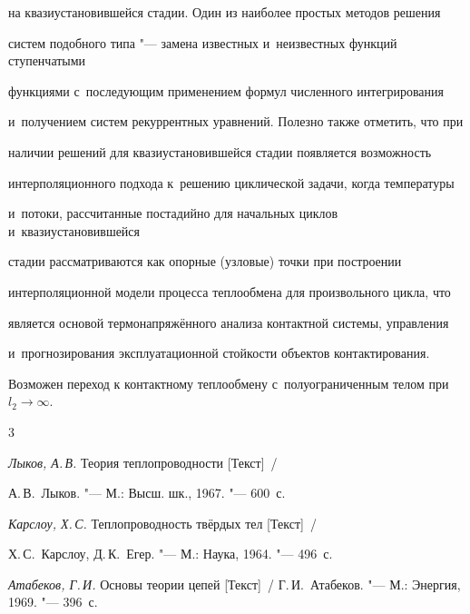 на квазиустановившейся стадии. Один из наиболее простых методов решения 

систем подобного типа "--- замена известных и~неизвестных функций ступенчатыми 

функциями с~последующим применением формул численного интегрирования 

и~получением систем рекуррентных уравнений. Полезно также отметить, что при 

наличии решений для квазиустановившейся стадии появляется возможность 

интерполяционного подхода к~решению циклической задачи, когда температуры 

и~потоки, рассчитанные постадийно для начальных циклов и~квазиустановившейся 

стадии рассматриваются как опорные (узловые) точки при построении 

интерполяционной модели процесса теплообмена для произвольного цикла, что 

является основой термонапряжённого анализа контактной системы, управления 

и~прогнозирования эксплуатационной стойкости объектов контактирования. 

Возможен переход к контактному теплообмену с~полуограниченным телом при $l_2 

\to \infty $. 



\newpage

\begin{thebibliography}{3}

\item \emph{Лыков, А.\,В.} Теория теплопроводности [Текст]~/

А.\,В.~Лыков. "--- М.: Высш. шк., 1967. "--- 600~с.



\item \emph{Карслоу, Х.\,С.} Теплопроводность твёрдых тел [Текст]~/

Х.\,С.~Карслоу, Д.\,К.~Егер. "--- М.: Наука, 1964. "--- 496~с.



\item \emph{Атабеков, Г.\,И.} Основы теории цепей [Текст]~/ Г.\,И.~Атабеков. "--- М.: Энергия, 1969. "--- 396~с.



\end{thebibliography}





\vspace{5mm}

\lfoot[]{}

  \rfoot[]{}



\makeengtitle







%

